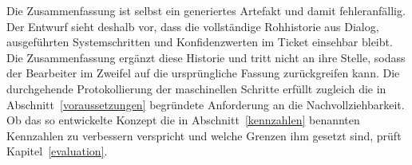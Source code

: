 Die Zusammenfassung ist selbst ein generiertes Artefakt und damit fehleranf\"allig. Der Entwurf sieht deshalb vor, dass die vollst\"andige Rohhistorie aus Dialog, ausgef\"uhrten Systemschritten und Konfidenzwerten im Ticket einsehbar bleibt. Die Zusammenfassung erg\"anzt diese Historie und tritt nicht an ihre Stelle, sodass der Bearbeiter im Zweifel auf die urspr\"ungliche Fassung zur\"uckgreifen kann. Die durchgehende Protokollierung der maschinellen Schritte erf\"ullt zugleich die in Abschnitt~\ref{voraussetzungen} begr\"undete Anforderung an die Nachvollziehbarkeit. Ob das so entwickelte Konzept die in Abschnitt~\ref{kennzahlen} benannten Kennzahlen zu verbessern verspricht und welche Grenzen ihm gesetzt sind, pr\"uft Kapitel~\ref{evaluation}.

